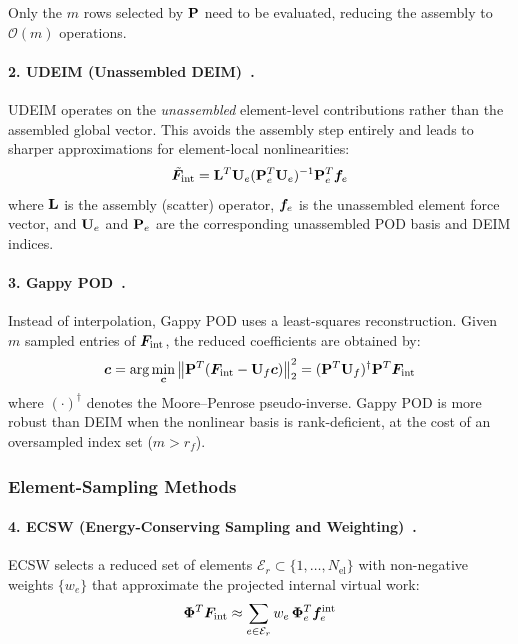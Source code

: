 Only the $m$ rows selected by $\mathbf{P}$ need to be evaluated, reducing the assembly to $\mathcal{O}(m)$ operations.

\paragraph{2. UDEIM (Unassembled DEIM)~\cite{tiso2013}.}
UDEIM operates on the \emph{unassembled} element-level contributions rather than the assembled global vector. This avoids the assembly step entirely and leads to sharper approximations for element-local nonlinearities:
\begin{equation}
    \tilde{\bm{F}}_{\text{int}} = \mathbf{L}^T \mathbf{U}_e (\mathbf{P}_e^T \mathbf{U}_e)^{-1} \mathbf{P}_e^T \bm{f}_e
\end{equation}
where $\mathbf{L}$ is the assembly (scatter) operator, $\bm{f}_e$ is the unassembled element force vector, and $\mathbf{U}_e$ and $\mathbf{P}_e$ are the corresponding unassembled POD basis and DEIM indices.

\paragraph{3. Gappy POD~\cite{everson1995}.}
Instead of interpolation, Gappy POD uses a least-squares reconstruction. Given $m$ sampled entries of $\bm{F}_{\text{int}}$, the reduced coefficients are obtained by:
\begin{equation}
    \bm{c} = \arg\min_{\bm{c}} \left\| \mathbf{P}^T (\bm{F}_{\text{int}} - \mathbf{U}_f \bm{c}) \right\|_2^2 = (\mathbf{P}^T \mathbf{U}_f)^{\dagger} \mathbf{P}^T \bm{F}_{\text{int}}
\end{equation}
where $(\cdot)^{\dagger}$ denotes the Moore--Penrose pseudo-inverse. Gappy POD is more robust than DEIM when the nonlinear basis is rank-deficient, at the cost of an oversampled index set ($m > r_f$).

\subsubsection{Element-Sampling Methods}

\paragraph{4. ECSW (Energy-Conserving Sampling and Weighting)~\cite{farhat2015}.}
ECSW selects a reduced set of elements $\mathcal{E}_r \subset \{1, \ldots, N_{\text{el}}\}$ with non-negative weights $\{w_e\}$ that approximate the projected internal virtual work:
\begin{equation}
    \mathbf{\Phi}^T \bm{F}_{\text{int}} \approx \sum_{e \in \mathcal{E}_r} w_e \, \mathbf{\Phi}_e^T \bm{f}_e^{\text{int}}
    \label{eq:ecsw}
\end{equation}

